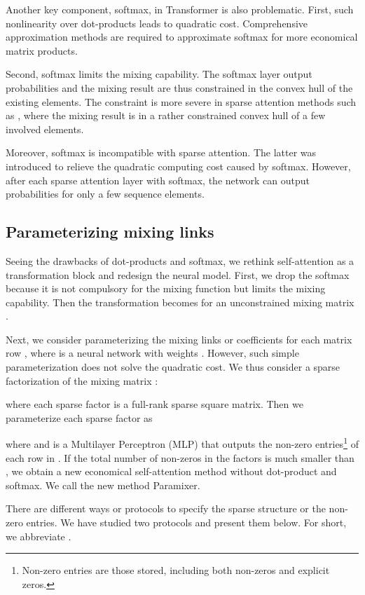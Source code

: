 \documentclass{article}
\begin{document}
Another key component, softmax, in Transformer is also problematic. First, such nonlinearity over dot-products leads to quadratic cost. Comprehensive approximation methods are required to approximate softmax for more economical matrix products.

Second, softmax limits the mixing capability. The softmax layer output probabilities and the mixing result are thus constrained in the convex hull of the existing elements. The constraint is more severe in sparse attention methods such as \cite{child2019generating,ainslie2020etc,tay2019lightweight,beltagy2020longformer,zaheer2020big}, where the mixing result is in a rather constrained convex hull of a few involved elements.

Moreover, softmax is incompatible with sparse attention. The latter was introduced to relieve the quadratic computing cost caused by softmax. However, after each sparse attention layer with softmax, the network can output probabilities for only a few sequence elements.

\subsection{Parameterizing mixing links}

Seeing the drawbacks of dot-products and softmax, we rethink self-attention as a transformation block and redesign the neural model. First, we drop the softmax because it is not compulsory for the mixing function but limits the mixing capability. Then the transformation becomes  for an unconstrained mixing matrix .

Next, we consider parameterizing the mixing links or coefficients for each matrix row , where  is a neural network with weights . However, such simple parameterization does not solve the quadratic cost. We thus consider a sparse factorization of the mixing matrix :

where each sparse factor  is a full-rank sparse square matrix. Then we parameterize each sparse factor  as

where  and  is a Multilayer Perceptron (MLP) that outputs the  non-zero entries\footnote{Non-zero entries are those stored, including both non-zeros and explicit zeros.} of each row in .
If the total number of non-zeros in the factors is much smaller than , we obtain a new economical self-attention method without dot-product and softmax. We call the new method Paramixer.

There are different ways or protocols to specify the sparse structure or the non-zero entries. We have studied two protocols and present them below. For short, we abbreviate .
\end{document}
